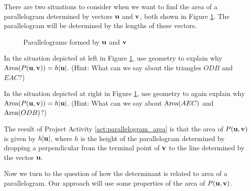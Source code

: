 \begin{pactivity} \label{act:parallelogram_area} There are two situations to consider when we want to find the area of a parallelogram determined by vectors $\mathbf{u}$ and $\mathbf{v}$, both shown in Figure \ref{F:parallelogram_area}. The parallelogram will be determined by the lengths of these vectors.
\begin{figure}[ht]
  \begin{center}
    \caption{Parallelograms formed by $\mathbf{u}$ and $\mathbf{v}$}
    \label{F:parallelogram_area}
  \end{center}
\end{figure}
\ba
\item In the situation depicted at left in Figure \ref{F:parallelogram_area}, use geometry to explain why $\text{Area}(P(\mathbf{u},\mathbf{v})) = h |\mathbf{u}|$. (Hint: What can we say about the triangles $ODB$ and $EAC$?)


\item In the situation depicted at right in Figure \ref{F:parallelogram_area}, use geometry to again explain why \\
$\text{Area}(P(\mathbf{u},\mathbf{v})) = h |\mathbf{u}|$. (Hint: What can we say about $\text{Area}(AEC)$ and  $\text{Area}(ODB)$?)

\ea

\end{pactivity}

The result of Project Activity \ref{act:parallelogram_area} is that the area of $P(\mathbf{u},\mathbf{v})$ is given by $h |\mathbf{u}|$, where $h$ is the height of the parallelogram determined by dropping a perpendicular from the terminal point of $\mathbf{v}$ to the line determined by the vector $\mathbf{u}$. 

Now we turn to the question of how the determinant is related to area of a parallelogram. Our approach will use some properties of the area of $P(\mathbf{u}, \mathbf{v})$. 

